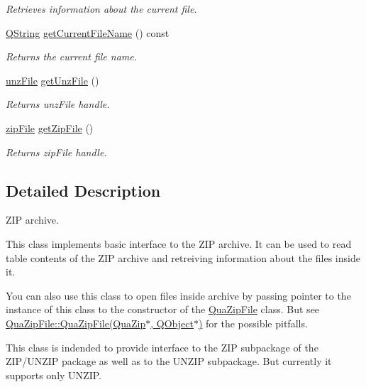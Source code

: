 \begin{DoxyCompactItemize}
\begin{DoxyCompactList}\small\item\em Retrieves information about the current file. \end{DoxyCompactList}\item 
\hyperlink{group___u_a_v_objects_plugin_gab9d252f49c333c94a72f97ce3105a32d}{Q\-String} \hyperlink{class_qua_zip_a9783f8b4f39cd55e71e975aea78fd54a}{get\-Current\-File\-Name} () const 
\begin{DoxyCompactList}\small\item\em Returns the current file name. \end{DoxyCompactList}\item 
\hyperlink{unzip_8h_ad578db1d36691a2a244482a3b2360ca3}{unz\-File} \hyperlink{class_qua_zip_a3b78a652f296ff4a678a791e8294e642}{get\-Unz\-File} ()
\begin{DoxyCompactList}\small\item\em Returns {\ttfamily unz\-File} handle. \end{DoxyCompactList}\item 
\hyperlink{zip_8h_af69b9a5ea9aaf8e8f0b7681e451b224c}{zip\-File} \hyperlink{class_qua_zip_a425043a4d7cc31e2fe2bba73d954f15c}{get\-Zip\-File} ()
\begin{DoxyCompactList}\small\item\em Returns {\ttfamily zip\-File} handle. \end{DoxyCompactList}\end{DoxyCompactItemize}


\subsection{Detailed Description}
Z\-I\-P archive. 

This class implements basic interface to the Z\-I\-P archive. It can be used to read table contents of the Z\-I\-P archive and retreiving information about the files inside it.

You can also use this class to open files inside archive by passing pointer to the instance of this class to the constructor of the \hyperlink{class_qua_zip_file}{Qua\-Zip\-File} class. But see \hyperlink{class_qua_zip_file_a54e944a6b3d27030f64c8f30d2cc33bb}{Qua\-Zip\-File\-::\-Qua\-Zip\-File(\-Qua\-Zip$\ast$, Q\-Object$\ast$)} for the possible pitfalls.

This class is indended to provide interface to the Z\-I\-P subpackage of the Z\-I\-P/\-U\-N\-Z\-I\-P package as well as to the U\-N\-Z\-I\-P subpackage. But currently it supports only U\-N\-Z\-I\-P.

